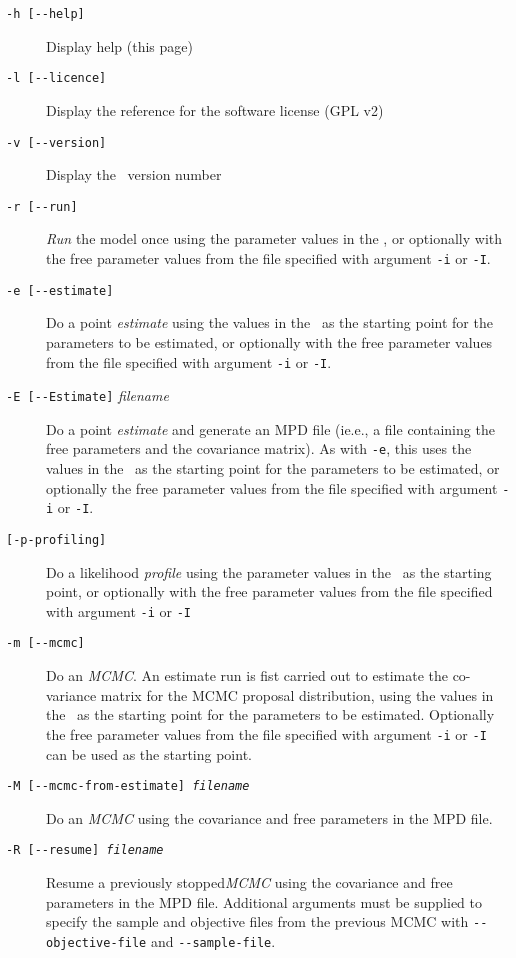 \begin{description}
\item [\texttt{-h [-{}-help]}] Display help (this page)
\item [\texttt{-l [-{}-licence]}] Display the reference for the software license (GPL v2)
\item [\texttt{-v [-{}-version]}] Display the \CNAME\ version number

\item [\texttt{-r [-{}-run]}] \emph{Run} the model once using the parameter values in the \config, or optionally with the free parameter values from the file specified with argument \texttt{-i} or \texttt{-I}.

\item [\texttt{-e [-{}-estimate]}] Do a point \emph{estimate} using the values in the \config\ as the starting point for the parameters to be estimated, or optionally with the free parameter values from the file specified with argument \texttt{-i} or \texttt{-I}.

\item [\texttt{-E [-{}-Estimate]} \emph{filename}] Do a point \emph{estimate} and generate an MPD file (ie.e., a file containing the free parameters and the covariance matrix). As with \texttt{-e}, this uses the values in the \config\ as the starting point for the parameters to be estimated, or optionally the free parameter values from the file specified with argument \texttt{-i} or \texttt{-I}.

\item [\texttt{[-{p}-profiling]}] Do a likelihood \emph{profile} using the parameter values in the \config\ as the starting point, or optionally with the free parameter values from the file specified with argument \texttt{-i} or \texttt{-I}

\item [\texttt{-m [-{}-mcmc]}] Do an \emph{MCMC}. An estimate run is fist carried out to estimate the co-variance matrix for the MCMC proposal distribution, using the values in the \config\ as the starting point for the parameters to be estimated. Optionally the free parameter values from the file specified with argument \texttt{-i} or \texttt{-I} can be used as the starting point.

\item [\texttt{-M [-{}-mcmc-from-estimate] \emph{filename}}] Do an \emph{MCMC} using the covariance and free parameters in the MPD file.

\item [\texttt{-R [-{}-resume] \emph{filename}}] Resume a previously stopped\emph{MCMC} using the covariance and free parameters in the MPD file. Additional arguments must be supplied to specify the sample and objective files from the previous MCMC with \texttt{-{}-objective-file} and \texttt{-{}-sample-file}.


\end{description}

